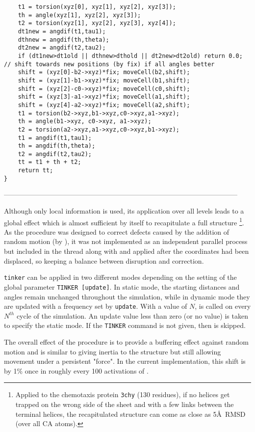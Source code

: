 \begin{singlespace}
\begin{tiny}
\begin{verbatim}
	t1 = torsion(xyz[0], xyz[1], xyz[2], xyz[3]);
	th = angle(xyz[1], xyz[2], xyz[3]);
	t2 = torsion(xyz[1], xyz[2], xyz[3], xyz[4]);
	dt1new = angdif(t1,tau1);
	dthnew = angdif(th,theta);
	dt2new = angdif(t2,tau2);
	if (dt1new>dt1old || dthnew>dthold || dt2new>dt2old) return 0.0;
// shift towards new positions (by fix) if all angles better
	shift = (xyz[0]-b2->xyz)*fix; moveCell(b2,shift);
	shift = (xyz[1]-b1->xyz)*fix; moveCell(b1,shift);
	shift = (xyz[2]-c0->xyz)*fix; moveCell(c0,shift);
	shift = (xyz[3]-a1->xyz)*fix; moveCell(a1,shift);
	shift = (xyz[4]-a2->xyz)*fix; moveCell(a2,shift);
	t1 = torsion(b2->xyz,b1->xyz,c0->xyz,a1->xyz);
	th = angle(b1->xyz, c0->xyz, a1->xyz);
	t2 = torsion(a2->xyz,a1->xyz,c0->xyz,b1->xyz);
	t1 = angdif(t1,tau1);
	th = angdif(th,theta);
	t2 = angdif(t2,tau2);
	tt = t1 + th + t2;
	return tt;
}
\end{verbatim}
\end{tiny}
------------------------------------------------------------------------------------------------------
\end{singlespace}

Although only local information is used, its application over all levels leads to a
global effect which is almost sufficient by itself to recapitulate a full structure
\footnote{
Applied to the chemotaxis protein {\tt 3chy} (130 residues), if no helices get 
trapped on the wrong side of the sheet and with a few links between the terminal helices,
the recapitulated structure can come as close as 5\AA\ RMSD (over all CA atoms).
}.
As the procedure was designed to correct defects caused by the addition of random
motion (by ), it was not implemented as an independent parallel process
but included in the thread along with  and applied after the coordinates
had been displaced, so keeping a balance between disruption and correction.

{\tt tinker} can be applied in two different modes depending on the setting of the
global parameter {\tt TINKER [update]}.   In static mode, the starting
distances and angles remain unchanged throughout the simulation, while in dynamic mode
they are updated with a frequency set by {\tt update}.  With a value of $N$, 
is called on every $N^{th}$ cycle of the simulation.  An update value less than zero (or
no value) is taken to specify the static mode.   If the {\tt TINKER} command is not
given, then  is skipped.

The overall effect of the  procedure is
to provide a buffering effect against random motion and is similar to giving
inertia to the structure but still allowing movement under a persistent "force".
In the current implementation, this shift is by 1\% once in roughly every 100
activations of .

